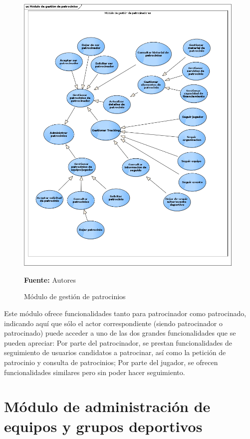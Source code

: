 \begin{figure}[!htb]
  \begin{center}
    \includegraphics[width=11cm]{./imagenes/casos_uso/gestion_patrocinios.png}
    \caption{Módulo de gestión de patrocinios}
    \label{fig:cu_gest_patr}
    \textbf{Fuente:} Autores
  \end{center}
\end{figure}

Este módulo ofrece funcionalidades tanto para patrocinador como patrocinado, indicando aquí que sólo el actor correspondiente (siendo patrocinador o patrocinado) puede acceder a uno de las dos grandes funcionalidades que se pueden apreciar: Por parte del patrocinador, se prestan funcionalidades de seguimiento de usuarios candidatos a patrocinar, así como la petición de patrocinio y consulta de patrocinios; Por parte del jugador, se ofrecen funcionalidades similares pero sin poder hacer seguimiento.

\section{Módulo de administración de equipos y grupos deportivos}

